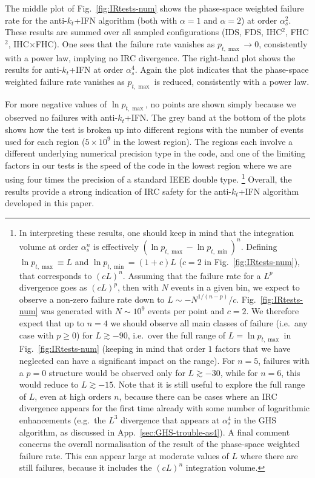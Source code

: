 \documentclass[nofootinbib,twocolumn,preprintnumbers,superscriptaddress,aps]{revtex4-2}
\newcommand{\as}{\alpha_s}
\newcommand{\lnptmin}{\ln p_{t,\min}}
\newcommand{\lnptmax}{\ln p_{t,\max}}
\newcommand{\ptmax}{p_{t,\max}}
\begin{document}
The middle plot of Fig.~\ref{fig:IRtests-num} shows the phase-space
weighted failure rate for the anti-$k_t$+IFN algorithm (both with
$\alpha=1$ and $\alpha=2$) at order $\as^2$.
%
These results are summed over all sampled
configurations (IDS, FDS, IHC$^2$, FHC$^2$, IHC$\times$FHC).
%
One sees that the failure rate vanishes as $\ptmax \to 0$,
consistently with a power law, implying no IRC divergence.
%
The right-hand plot shows the results for anti-$k_t$+IFN at order
$\as^4$.
%
Again the plot indicates that the phase-space weighted failure rate
vanishes as $\ptmax$ is reduced, consistently with a power law.


For more negative values of $\lnptmax$, no points are shown
simply because we observed no failures with anti-$k_t$+IFN.
%
The grey band at the bottom of the plots shows how the test is broken
up into different regions with the number of events used for each
region ($5\times 10^9$ in the lowest region).
%
The regions each involve a different underlying numerical precision
type in the code, and one of the limiting factors in our tests is the
speed of the code in the lowest region where we are using four times
the precision of a standard IEEE double type.%
%
\footnote{\label{footnote:lnptMaxMin}In interpreting these results, one should keep in mind that
  the integration volume at order $\as^n$ is effectively
  $(\lnptmax-\lnptmin)^n$.
  Defining $\lnptmax \equiv L$ and $\lnptmin = (1+c)L$ ($c=2$ in
  Fig.~\ref{fig:IRtests-num}), that corresponds to $(cL)^n$.
  Assuming that the failure rate for a $L^p$ divergence goes as
  $(cL)^p$, then with $N$ events in a given bin, we expect to observe
  a non-zero failure rate down to $L\sim -N^{1/({n-p})}/c$.
  Fig.~\ref{fig:IRtests-num} was generated with $N \sim 10^9$ events
  per point and $c=2$.
  We therefore expect that up to $n=4$ we should observe all main classes
  of failure (i.e.\ any case with $p\ge 0$) for $L\gtrsim -90$, i.e.\
  over the full range of $L = \lnptmax$ in
  Fig.~\ref{fig:IRtests-num} (keeping in mind that order $1$ factors
  that we have neglected can have a significant impact on the range).
  For $n=5$, failures with a $p=0$ structure would be observed only
  for $L \gtrsim -30$, while for $n=6$, this would reduce to $L
  \gtrsim -15$.
  Note that it is still useful to explore the full range of $L$, even
  at high orders $n$, because there can be cases where an IRC
  divergence appears for the first time already with some number of
  logarithmic enhancements (e.g.\ the $L^3$ divergence that appears at
  $\as^4$ in the GHS algorithm, as discussed in
  App.~\ref{sec:GHS-trouble-as4}).
  A final comment concerns the overall normalisation of the
  result of the phase-space weighted failure rate. This can appear
  large at moderate values of $L$ where there are still failures,
  because it includes the $(cL)^n$ integration volume. }
Overall,
the results provide a strong indication of IRC safety for the
anti-$k_t$+IFN algorithm developed in this paper.
\end{document}
